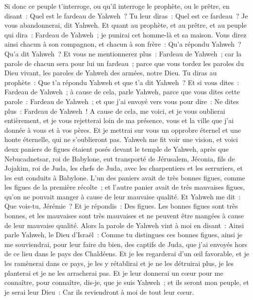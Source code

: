 \begin{multicols}{2}
Si donc ce peuple t'interroge, ou qu'il interroge le prophète, ou le prêtre, en disant~: Quel est le fardeau de Yahweh~? Tu leur diras~: Quel est ce fardeau~? Je vous abandonnerai, dit Yahweh.
Et quant au prophète, et au prêtre, et au peuple qui dira~: Fardeau de Yahweh~; je punirai cet homme-là et sa maison.
Vous direz ainsi chacun à son compagnon, et chacun à son frère~: Qu'a répondu Yahweh~? Qu'a dit Yahweh~?
Et vous ne mentionnerez plus~: Fardeau de Yahweh~; car la parole de chacun sera pour lui un fardeau~; parce que vous tordez les paroles du Dieu vivant, les paroles de Yahweh des armées, notre Dieu.
Tu diras au prophète~: Que t'a répondu Yahweh et que t'a dit Yahweh~?
Et si vous dites~: Fardeau de Yahweh~; à cause de cela, parle Yahweh, parce que vous dites cette parole~: Fardeau de Yahweh~; et que j'ai envoyé vers vous pour dire~: Ne dites plus~: Fardeau de Yahweh~!
A cause de cela, me voici, et je vous oublierai entièrement, et je vous rejetterai loin de ma présence, vous et la ville que j'ai donnée à vous et à vos pères.
Et je mettrai sur vous un opprobre éternel et une honte éternelle, qui ne s'oublieront pas.
\VerseOne{}Yahweh me fit voir une vision, et voici deux paniers de figues étaient posés devant le temple de Yahweh, après que Nebucadnetsar, roi de Babylone, eut transporté de Jérusalem, Jéconia, fils de Jojakim, roi de Juda, les chefs de Juda, avec les charpentiers et les serruriers, et les eut conduits à Babylone.
L'un des paniers avait de très bonnes figues, comme les figues de la première récolte~; et l'autre panier avait de très mauvaises figues, qu'on ne pouvait manger à cause de leur mauvaise qualité.
Et Yahweh me dit~: Que vois-tu, Jérémie~? Et je répondis~: Des figues. Les bonnes figues sont très bonnes, et les mauvaises sont très mauvaises et ne peuvent être mangées à cause de leur mauvaise qualité.
Alors la parole de Yahweh vint à moi en disant~:
Ainsi parle Yahweh, le Dieu d'Israël~: Comme tu distingues ces bonnes figues, ainsi je me souviendrai, pour leur faire du bien, des captifs de Juda, que j'ai envoyés hors de ce lieu dans le pays des Chaldéens.
Et je les regarderai d'un œil favorable, et je les ramènerai dans ce pays, je les y rétablirai et je ne les détruirai plus, je les planterai et je ne les arracherai pas.
Et je leur donnerai un cœur pour me connaître, pour connaître, dis-je, que je suis Yahweh~; et ils seront mon peuple, et je serai leur Dieu~: Car ils reviendront à moi de tout leur cœur.

\end{multicols}
